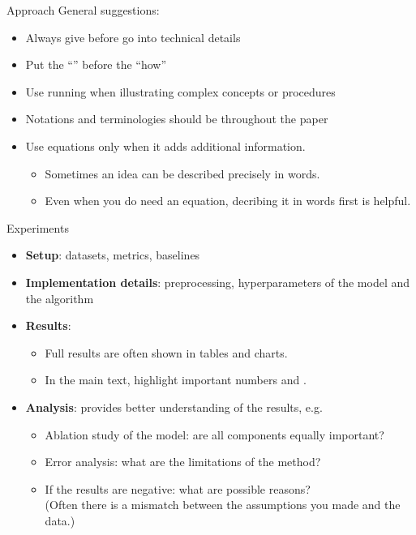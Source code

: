\documentclass[usenames,dvipsnames,11pt,aspectratio=169]{beamer}
\begin{document}
\begin{frame}
    {Approach}
    General suggestions:\\
    \begin{itemize}
        \item Always give  before go into technical details
        \item Put the ``'' before the ``how''
        \item Use running  when illustrating complex concepts or procedures
        \item Notations and terminologies should be  throughout the paper
        \item Use equations only when it adds additional information.
            \begin{itemize}
                \item Sometimes an idea can be described precisely in words.
                \item Even when you do need an equation, decribing it in words first is helpful.
            \end{itemize}
    \end{itemize}
\end{frame}

\begin{frame}
    {Experiments}
    \begin{itemize}
        \item {\bf Setup}: datasets, metrics, baselines
        \item {\bf Implementation details}: preprocessing, hyperparameters of the model and the algorithm
        \item {\bf Results}:
            \begin{itemize}
                \item Full results are often shown in tables and charts.
                \item In the main text, highlight important numbers and .
            \end{itemize}
        \item {\bf Analysis}: provides better understanding of the results, e.g.
            \begin{itemize}
                \item Ablation study of the model: are all components equally important?
                \item Error analysis: what are the limitations of the method?
                \item If the results are negative: what are possible reasons?\\
                    (Often there is a mismatch between the assumptions you made and the data.)
            \end{itemize}
    \end{itemize}
\end{frame}
\end{document}
